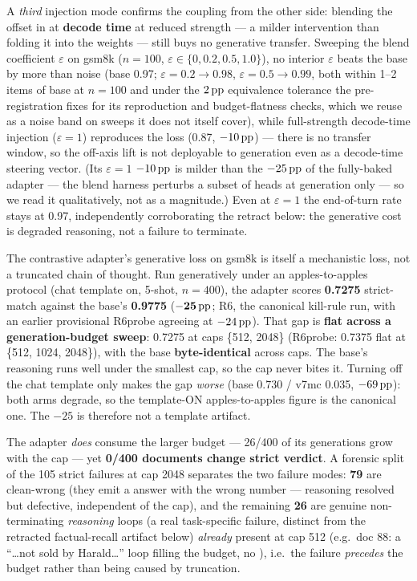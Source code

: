 A \emph{third} injection mode confirms the coupling from the other side: blending
the offset in at \textbf{decode time} at reduced strength --- a milder intervention
than folding it into the weights --- still buys no generative transfer. Sweeping
the blend coefficient $\varepsilon$ on gsm8k ($n{=}100$,
$\varepsilon \in \{0, 0.2, 0.5, 1.0\}$), no interior $\varepsilon$ beats the base
by more than noise (base 0.97; $\varepsilon{=}0.2 \rightarrow 0.98$,
$\varepsilon{=}0.5 \rightarrow 0.99$, both within 1--2 items of base at $n{=}100$
and under the $2\,\mathrm{pp}$ equivalence tolerance the pre-registration fixes for its
reproduction and budget-flatness checks, which we reuse as a noise band on sweeps it
does not itself cover), while full-strength decode-time injection
($\varepsilon{=}1$) reproduces the loss (0.87, $-10\,\mathrm{pp}$) --- there is no transfer
window, so the off-axis lift is not deployable to generation even as a decode-time
steering vector. (Its $\varepsilon{=}1$ $-10\,\mathrm{pp}$ is milder than the $-25\,\mathrm{pp}$ of the
fully-baked adapter --- the blend harness perturbs a subset of heads at generation
only --- so we read it qualitatively, not as a magnitude.) Even at
$\varepsilon{=}1$ the end-of-turn rate stays at 0.97, independently corroborating
the retract below: the generative cost is degraded reasoning, not a failure to
terminate.

The contrastive adapter's generative loss on gsm8k is itself a mechanistic loss,
not a truncated chain of thought. Run generatively under an apples-to-apples
protocol (chat template on, 5-shot, $n{=}400$), the adapter scores \textbf{0.7275}
strict-match against the base's \textbf{0.9775} ($\mathbf{-25\,\mathrm{pp}}$; R6, the
canonical kill-rule run, with an earlier provisional R6probe agreeing at $-24\,\mathrm{pp}$).
That gap is \textbf{flat across a generation-budget sweep}: 0.7275 at caps
\{512, 2048\} (R6probe: 0.7375 flat at \{512, 1024, 2048\}), with the base
\textbf{byte-identical} across caps. The base's reasoning runs well under the
smallest cap, so the cap never bites it. Turning off the chat template only makes
the gap \emph{worse} (base 0.730 / v7mc 0.035, $-69\,\mathrm{pp}$): both arms degrade, so the
template-ON apples-to-apples figure is the canonical one. The $-25$ is therefore
not a template artifact.

The adapter \emph{does} consume the larger budget --- 26/400 of its generations
grow with the cap --- yet \textbf{0/400 documents change strict verdict}. A
forensic split of the 105 strict failures at cap 2048 separates the two failure
modes: \textbf{79} are clean-wrong (they emit a \code{\#\#\#\#} answer with the
wrong number --- reasoning resolved but defective, independent of the cap), and the
remaining \textbf{26} are genuine non-terminating \emph{reasoning} loops (a real
task-specific failure, distinct from the retracted factual-recall artifact below)
\emph{already} present at cap 512 (e.g.\ doc 88: a ``\ldots not sold by
Harald\ldots'' loop filling the budget, no \code{\#\#\#\#}), i.e.\ the failure
\emph{precedes} the budget rather than being caused by truncation.

